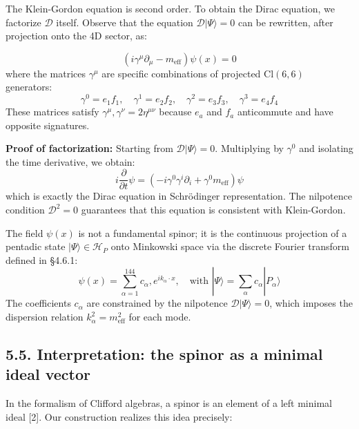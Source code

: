\documentclass[11pt]{article}
\let\oldmathcal\mathcal
\renewcommand{\mathcal}[1]{\oldmathcal{#1}}
\begin{document}
The Klein-Gordon equation is second order. To obtain the Dirac equation,
we factorize \(\mathcal{D}\) itself. Observe that the equation
\(\mathcal{D}|\Psi\rangle = 0\) can be rewritten, after projection onto
the 4D sector, as:

\[
\left( i\gamma^\mu \partial_\mu - m_{\text{eff}} \right) \psi(x) = 0
\] where the matrices \(\gamma^\mu\) are specific combinations of
projected \(\text{Cl}(6,6)\) generators: \[
\gamma^0 = e_1 f_1, \quad \gamma^1 = e_2 f_2, \quad \gamma^2 = e_3 f_3, \quad \gamma^3 = e_4 f_4
\] These matrices satisfy \({\gamma^\mu, \gamma^\nu} = 2\eta^{\mu\nu}\)
because \(e_a\) and \(f_a\) anticommute and have opposite signatures.

\textbf{Proof of factorization:} Starting from
\(\mathcal{D}|\Psi\rangle = 0\). Multiplying by \(\gamma^0\) and
isolating the time derivative, we obtain: \[
i\frac{\partial}{\partial t} \psi = \left( -i\gamma^0 \gamma^i \partial_i + \gamma^0 m_{\text{eff}} \right) \psi
\] which is exactly the Dirac equation in Schrödinger representation.
The nilpotence condition \(\mathcal{D}^2=0\) guarantees that this
equation is consistent with Klein-Gordon.

The field \(\psi(x)\) is not a fundamental spinor; it is the continuous
projection of a pentadic state \(|\Psi\rangle \in \mathcal{H}_P\) onto
Minkowski space via the discrete Fourier transform defined in §4.6.1: \[
\psi(x) = \sum_{\alpha=1}^{144} c_\alpha , e^{i k_\alpha \cdot x}, \quad \text{with } |\Psi\rangle = \sum_{\alpha} c_\alpha |P_\alpha\rangle
\] The coefficients \(c_\alpha\) are constrained by the nilpotence
\(\mathcal{D}|\Psi\rangle=0\), which imposes the dispersion relation
\(k_\alpha^2 = m_{\text{eff}}^2\) for each mode.

\hypertarget{interpretation-the-spinor-as-a-minimal-ideal-vector}{%
\subsection{5.5. Interpretation: the spinor as a minimal ideal
vector}\label{interpretation-the-spinor-as-a-minimal-ideal-vector}}

In the formalism of Clifford algebras, a spinor is an element of a left
minimal ideal {[}2{]}. Our construction realizes this idea precisely:
\end{document}
